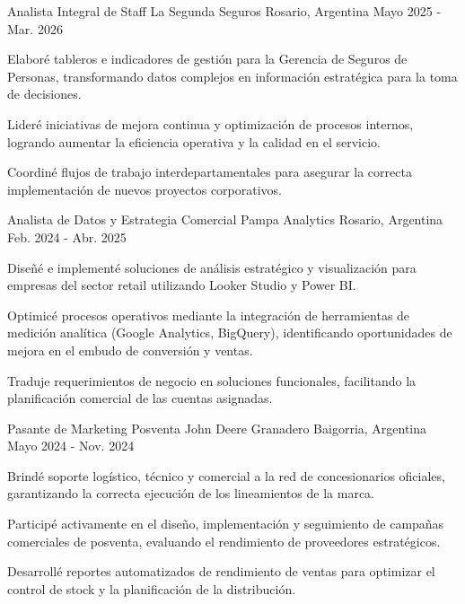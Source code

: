 \documentclass[11pt, a4paper]{awesome-cv}
\begin{document}
\begin{cventries}

  \cventry
    {Analista Integral de Staff} %
    {La Segunda Seguros} %
    {Rosario, Argentina} %
    {Mayo 2025 - Mar. 2026} %
    {
      \begin{cvitems} %
        \item {Elaboré tableros e indicadores de gestión para la Gerencia de Seguros de Personas, transformando datos complejos en información estratégica para la toma de decisiones.}
        \item {Lideré iniciativas de mejora continua y optimización de procesos internos, logrando aumentar la eficiencia operativa y la calidad en el servicio.}
        \item {Coordiné flujos de trabajo interdepartamentales para asegurar la correcta implementación de nuevos proyectos corporativos.}
      \end{cvitems}
    }

  \cventry
    {Analista de Datos y Estrategia Comercial} %
    {Pampa Analytics} %
    {Rosario, Argentina} %
    {Feb. 2024 - Abr. 2025} %
    {
      \begin{cvitems}
        \item {Diseñé e implementé soluciones de análisis estratégico y visualización para empresas del sector retail utilizando Looker Studio y Power BI.}
        \item {Optimicé procesos operativos mediante la integración de herramientas de medición analítica (Google Analytics, BigQuery), identificando oportunidades de mejora en el embudo de conversión y ventas.}
        \item {Traduje requerimientos de negocio en soluciones funcionales, facilitando la planificación comercial de las cuentas asignadas.}
      \end{cvitems}
    }

  \cventry
    {Pasante de Marketing Posventa} %
    {John Deere} %
    {Granadero Baigorria, Argentina} %
    {Mayo 2024 - Nov. 2024} %
    {
      \begin{cvitems}
        \item {Brindé soporte logístico, técnico y comercial a la red de concesionarios oficiales, garantizando la correcta ejecución de los lineamientos de la marca.}
        \item {Participé activamente en el diseño, implementación y seguimiento de campañas comerciales de posventa, evaluando el rendimiento de proveedores estratégicos.}
        \item {Desarrollé reportes automatizados de rendimiento de ventas para optimizar el control de stock y la planificación de la distribución.}
      \end{cvitems}
    }


\end{cventries}
\end{document}
